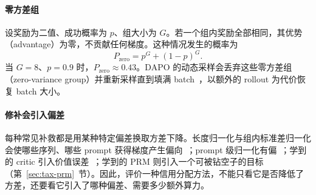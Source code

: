 \paragraph{零方差组}
设奖励为二值、成功概率为 $p$、组大小为 $G$。若一个组内奖励全部相同，其优势（advantage）为零，不贡献任何梯度。这种情况发生的概率为
\begin{equation}
  P_{\text{zero}}=p^{G}+(1-p)^{G}.
  \label{eq:zerovar}
\end{equation}
当 $G=8$、$p=0.9$ 时，$P_{\text{zero}}\approx0.43$。DAPO 的动态采样会丢弃这些零方差组（zero-variance group）并重新采样直到填满 batch~\citep{yu2025dapo}，以额外的 rollout 为代价恢复 batch 大小。

\paragraph{修补会引入偏差}
每种常见补救都是用某种特定偏差换取方差下降。长度归一化与组内标准差归一化会使哪些序列、哪些 prompt 获得梯度产生偏向~\citep{liu2025understanding}；prompt 级归一化有偏~\citep{hu2025reinforce}；学到的 critic 引入价值误差~\citep{yuan2025whats}；学到的 PRM 则引入一个可被钻空子的目标（第~\ref{sec:tax-prm}~节）。因此，评价一种信用分配方法，不能只看它是否降低了方差，还要看它引入了哪种偏差、需要多少额外算力。

